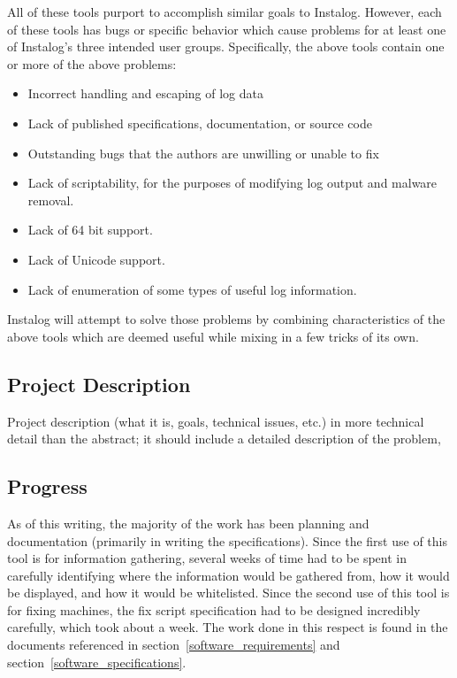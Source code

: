 \documentclass[letterpaper,12pt]{article}
\begin{document}
All of these tools purport to accomplish similar goals to Instalog. However,
each of these tools has bugs or specific behavior which cause problems for at
least one of Instalog's three intended user groups.  Specifically, the above
tools contain one or more of the above problems:

\begin{itemize}
    \item Incorrect handling and escaping of log data
    \item Lack of published specifications, documentation, or source code
    \item Outstanding bugs that the authors are unwilling or unable to fix
    \item Lack of scriptability, for the purposes of modifying log output and
    malware removal.
    \item Lack of 64 bit support.
    \item Lack of Unicode support.
    \item Lack of enumeration of some types of useful log information.
\end{itemize}

Instalog will attempt to solve those problems by combining characteristics of
the above tools which are deemed useful while mixing in a few tricks of its
own.

\subsection{Project Description}
Project description (what it is, goals, technical issues, etc.) in more
technical detail than the abstract; it should include a detailed description of
the problem,

\subsection{Progress}
As of this writing, the majority of the work has been planning and documentation
(primarily in writing the specifications).  Since the first use of this tool is
for information gathering, several weeks of time had to be spent in carefully
identifying where the information would be gathered from, how it would be
displayed, and how it would be whitelisted.  Since the second use of this tool
is for fixing machines, the fix script specification had to be designed
incredibly carefully, which took about a week.  The work done in this respect is
found in the documents referenced in section~\ref{software_requirements} and
section~\ref{software_specifications}.
\end{document}
